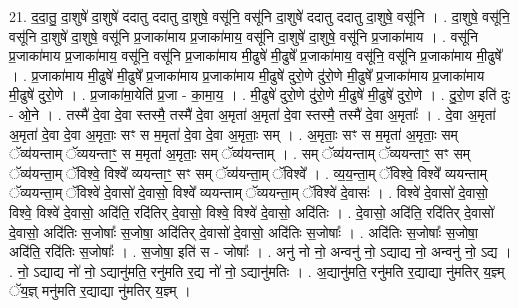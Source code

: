 \documentclass[17pt]{extarticle}
\begin{document}
21. द॒दा॒तु॒ दा॒शुषे॑ दा॒शुषे॑ ददातु ददातु दा॒शुषे॒ वसू॑नि॒ वसू॑नि दा॒शुषे॑ ददातु ददातु दा॒शुषे॒ वसू॑नि । . दा॒शुषे॒ वसू॑नि॒ वसू॑नि दा॒शुषे॑ दा॒शुषे॒ वसू॑नि प्र॒जाका॑माय प्र॒जाका॑माय॒ वसू॑नि दा॒शुषे॑ दा॒शुषे॒ वसू॑नि प्र॒जाका॑माय । . वसू॑नि प्र॒जाका॑माय प्र॒जाका॑माय॒ वसू॑नि॒ वसू॑नि प्र॒जाका॑माय मी॒ढुषे॑ मी॒ढुषे᳚ प्र॒जाका॑माय॒ वसू॑नि॒ वसू॑नि प्र॒जाका॑माय मी॒ढुषे᳚ । . प्र॒जाका॑माय मी॒ढुषे॑ मी॒ढुषे᳚ प्र॒जाका॑माय प्र॒जाका॑माय मी॒ढुषे॑ दुरो॒णे दु॑रो॒णे मी॒ढुषे᳚ प्र॒जाका॑माय प्र॒जाका॑माय मी॒ढुषे॑ दुरो॒णे । . प्र॒जाका॑मा॒येति॑ प्र॒जा - का॒मा॒य॒ । . मी॒ढुषे॑ दुरो॒णे दु॑रो॒णे मी॒ढुषे॑ मी॒ढुषे॑ दुरो॒णे । . दु॒रो॒ण इति॑ दुः - ओ॒ने । . तस्मै॑ दे॒वा दे॒वा स्तस्मै॒ तस्मै॑ दे॒वा अ॒मृता॑ अ॒मृता॑ दे॒वा स्तस्मै॒ तस्मै॑ दे॒वा अ॒मृताः᳚ । . दे॒वा अ॒मृता॑ अ॒मृता॑ दे॒वा दे॒वा अ॒मृताः॒ सꣳ स म॒मृता॑ दे॒वा दे॒वा अ॒मृताः॒ सम् । . अ॒मृताः॒ सꣳ स म॒मृता॑ अ॒मृताः॒ सम् ॅव्य॑यन्ताम् ॅव्ययन्ताꣳ॒॒ स म॒मृता॑ अ॒मृताः॒ सम् ॅव्य॑यन्ताम् । . सम् ॅव्य॑यन्ताम् ॅव्ययन्ताꣳ॒॒ सꣳ सम् ॅव्य॑यन्ता॒म् ॅविश्वे॒ विश्वे᳚ व्ययन्ताꣳ॒॒ सꣳ सम् ॅव्य॑यन्ता॒म् ॅविश्वे᳚ । . व्य॒य॒न्ता॒म् ॅविश्वे॒ विश्वे᳚ व्ययन्ताम् ॅव्ययन्ता॒म् ॅविश्वे॑ दे॒वासो॑ दे॒वासो॒ विश्वे᳚ व्ययन्ताम् ॅव्ययन्ता॒म् ॅविश्वे॑ दे॒वासः॑ । . विश्वे॑ दे॒वासो॑ दे॒वासो॒ विश्वे॒ विश्वे॑ दे॒वासो॒ अदि॑ति॒ रदि॑तिर् दे॒वासो॒ विश्वे॒ विश्वे॑ दे॒वासो॒ अदि॑तिः । . दे॒वासो॒ अदि॑ति॒ रदि॑तिर् दे॒वासो॑ दे॒वासो॒ अदि॑तिः स॒जोषाः᳚ स॒जोषा॒ अदि॑तिर् दे॒वासो॑ दे॒वासो॒ अदि॑तिः स॒जोषाः᳚ । . अदि॑तिः स॒जोषाः᳚ स॒जोषा॒ अदि॑ति॒ रदि॑तिः स॒जोषाः᳚ । . स॒जोषा॒ इति॑ स - जोषाः᳚ । . अनु॑ नो नो॒ अन्वनु॑ नो॒ ऽद्याद्य नो॒ अन्वनु॑ नो॒ ऽद्य । . नो॒ ऽद्याद्य नो॑ नो॒ ऽद्यानु॑मति॒ रनु॑मति र॒द्य नो॑ नो॒ ऽद्यानु॑मतिः । . अ॒द्यानु॑मति॒ रनु॑मति र॒द्याद्या नु॑मतिर् य॒ज्ञ्म् ॅय॒ज्ञ् मनु॑मति र॒द्याद्या नु॑मतिर् य॒ज्ञ्म् । \newline
\end{document}
